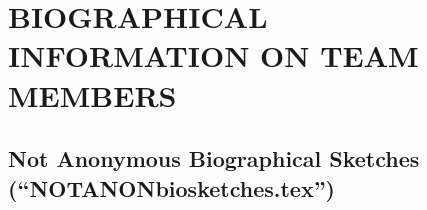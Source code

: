 \documentclass[usenames,dvipsnames,modern]{CLASS_FILES/aastex631}
\begin{document}
\newpage
{\mbox{} \vfill \section{BIOGRAPHICAL INFORMATION ON TEAM MEMBERS} \vfill \mbox{}}

\newpage
\subsection{\textbf{Not} Anonymous Biographical Sketches (``NOTANONbiosketches.tex'')}
\def\myNameBoldface#1{\textbf{#1}} %
\def\myNameColor{Blue} %
\def\myNameSize{\large } %
\def\myLabelBoldface#1{\textbf{#1}} %
\def\mySectionSpacing{\par \vspace{-0.5em}} %


\newpage
\end{document}
